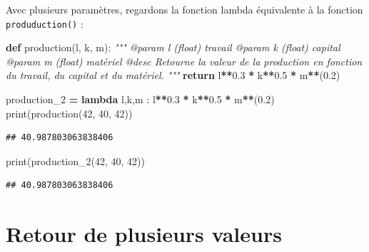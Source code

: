 \documentclass[12pt,]{book}
\newenvironment{Shaded}{\begin{snugshade}}{\end{snugshade}}
\newcommand{\KeywordTok}[1]{\textcolor[rgb]{0.13,0.29,0.53}{\textbf{#1}}}
\newcommand{\DecValTok}[1]{\textcolor[rgb]{0.00,0.00,0.81}{#1}}
\newcommand{\FloatTok}[1]{\textcolor[rgb]{0.00,0.00,0.81}{#1}}
\newcommand{\CommentTok}[1]{\textcolor[rgb]{0.56,0.35,0.01}{\textit{#1}}}
\newcommand{\ControlFlowTok}[1]{\textcolor[rgb]{0.13,0.29,0.53}{\textbf{#1}}}
\newcommand{\OperatorTok}[1]{\textcolor[rgb]{0.81,0.36,0.00}{\textbf{#1}}}
\newcommand{\BuiltInTok}[1]{#1}
\newcommand{\NormalTok}[1]{#1}
\numberwithin{equation}{section}
\numberwithin{countremarque}{section}
\begin{document}
Avec plusieurs paramètres, regardons la fonction lambda équivalente à la
fonction \texttt{produduction()} :

\begin{Shaded}
\begin{Highlighting}[]
\KeywordTok{def}\NormalTok{ production(l, k, m):}
  \CommentTok{"""}
\CommentTok{  @param l (float) travail}
\CommentTok{  @param k (float) capital}
\CommentTok{  @param m (float) matériel}
\CommentTok{  @desc Retourne la valeur de la production en fonction}
\CommentTok{    du travail, du capital et du matériel.}
\CommentTok{  """}
  \ControlFlowTok{return}\NormalTok{ l}\OperatorTok{**}\FloatTok{0.3} \OperatorTok{*}\NormalTok{ k}\OperatorTok{**}\FloatTok{0.5} \OperatorTok{*}\NormalTok{ m}\OperatorTok{**}\NormalTok{(}\FloatTok{0.2}\NormalTok{)}
\end{Highlighting}
\end{Shaded}

\begin{Shaded}
\begin{Highlighting}[]
\NormalTok{production_2 }\OperatorTok{=} \KeywordTok{lambda}\NormalTok{ l,k,m : l}\OperatorTok{**}\FloatTok{0.3} \OperatorTok{*}\NormalTok{ k}\OperatorTok{**}\FloatTok{0.5} \OperatorTok{*}\NormalTok{ m}\OperatorTok{**}\NormalTok{(}\FloatTok{0.2}\NormalTok{)}
\BuiltInTok{print}\NormalTok{(production(}\DecValTok{42}\NormalTok{, }\DecValTok{40}\NormalTok{, }\DecValTok{42}\NormalTok{))}
\end{Highlighting}
\end{Shaded}

\begin{lstlisting}
## 40.987803063838406
\end{lstlisting}

\begin{Shaded}
\begin{Highlighting}[]
\BuiltInTok{print}\NormalTok{(production_2(}\DecValTok{42}\NormalTok{, }\DecValTok{40}\NormalTok{, }\DecValTok{42}\NormalTok{))}
\end{Highlighting}
\end{Shaded}

\begin{lstlisting}
## 40.987803063838406
\end{lstlisting}

\section{Retour de plusieurs valeurs}\label{retour-de-plusieurs-valeurs}
\end{document}
